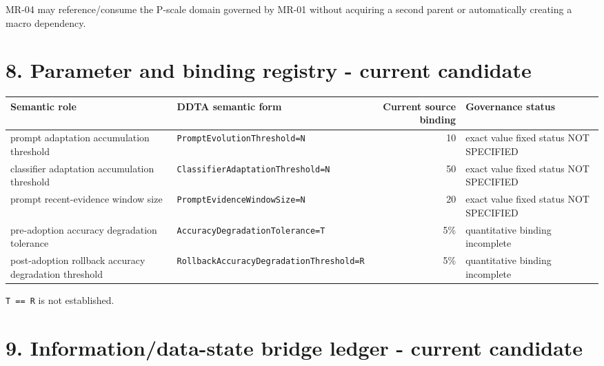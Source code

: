 \documentclass[11pt,a4paper]{article}
\begin{document}
MR-04 may reference/consume the P-scale domain governed by MR-01 without
acquiring a second parent or automatically creating a macro dependency.

\section{8. Parameter and binding registry - current
candidate}\label{8-parameter-and-binding-registry---current-candidate}

\begin{longtable}[]{@{}llrl@{}}
\toprule\noalign{}
Semantic role & DDTA semantic form & Current source binding & Governance
status \\
\midrule\noalign{}
\endhead
\bottomrule\noalign{}
\endlastfoot
prompt adaptation accumulation threshold &
\texttt{PromptEvolutionThreshold=N} & 10 & exact value fixed status NOT
SPECIFIED \\
classifier adaptation accumulation threshold &
\texttt{ClassifierAdaptationThreshold=N} & 50 & exact value fixed status
NOT SPECIFIED \\
prompt recent-evidence window size & \texttt{PromptEvidenceWindowSize=N}
& 20 & exact value fixed status NOT SPECIFIED \\
pre-adoption accuracy degradation tolerance &
\texttt{AccuracyDegradationTolerance=T} & 5\% & quantitative binding
incomplete \\
post-adoption rollback accuracy degradation threshold &
\texttt{RollbackAccuracyDegradationThreshold=R} & 5\% & quantitative
binding incomplete \\
\end{longtable}

\texttt{T\ ==\ R} is not established.

\section{9. Information/data-state bridge ledger - current
candidate}\label{9-informationdata-state-bridge-ledger---current-candidate}
\end{document}
